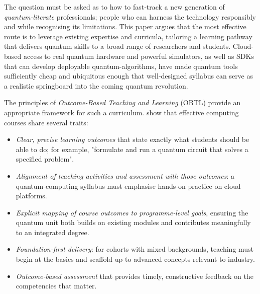 The question must be asked as to how to fast‑track a new generation of \emph{quantum‑literate} professionals; 
people who can harness the technology responsibly and while recognising its limitations.
This paper argues that the most effective route is to leverage existing expertise and curricula,
tailoring a learning pathway that delivers quantum skills to a broad range of researchers and students.
Cloud-based access to real quantum hardware and powerful simulators, as well as SDKs that can develop deployable quantum-algorithms, 
have made quantum tools sufficiently cheap and ubiquitous enough that 
well‑designed syllabus can serve as a realistic springboard into the coming quantum revolution.

%

The principles of \emph{Outcome-Based Teaching and Learning} (OBTL) provide an appropriate framework for such a curriculum.
\citeauthor{Wong:2011} \cite{Wong:2011} show that
effective computing courses share several traits:
\begin{itemize}
	\item \emph{Clear, precise learning outcomes} that state exactly what students should be able to do; for example, "formulate and run a quantum circuit that solves a specified problem".
	\item \emph{Alignment of teaching activities and assessment with those outcomes}: a quantum‑computing syllabus must emphasise hands‑on practice on cloud platforms.
	\item \emph{Explicit mapping of course outcomes to programme‑level goals}, ensuring the quantum unit both builds on existing modules and contributes meaningfully to an integrated degree.
	\item \emph{Foundation‑first delivery}: for cohorts with mixed backgrounds, teaching must begin at the basics and scaffold up to advanced concepts relevant to industry.
	\item \emph{Outcome‑based assessment} that provides timely, constructive feedback on the competencies that matter.
\end{itemize}

